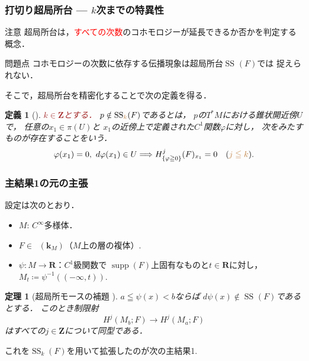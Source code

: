 \documentclass[dvipdfmx,10pt,aspectratio=169,leqno]{beamer}%
\newcommand{\zz}{\mathbf{Z}}
\newcommand{\rr}{\mathbf{R}}
\newcommand{\kk}{\mathbf{k}}
\numberwithin{equation}{subsection}
\newcommand{\supp}{\mathop{\mathrm{supp}}\nolimits}
\newcommand{\Dompb}{\mathop{\mathsf{D}^\mathrm{b}}\nolimits}
\newcommand{\muS}[1][]{\mathop{\mathrm{SS}}\nolimits_{#1}}
\newcommand{\cotb}[1][]{T^{\ast}{#1}}
\theoremstyle{mystyle}
\newtheorem{DFN}[AXM]{定義}
\newtheorem{THM}[AXM]{定理}
\begin{document}
\begin{frame}\frametitle{打切り超局所台 --- \(k\)次までの特異性}
    \begin{alertblock}{注意}
        超局所台は，\textcolor{red}{すべての次数}のコホモロジーが延長できるか否かを判定する概念．
    \end{alertblock}
    \begin{alertblock}{問題点}
      コホモロジーの次数に依存する伝播現象は超局所台\(\muS[](F)\)では
      捉えられない．
    \end{alertblock}
    
    そこで，超局所台を精密化することで次の定義を得る．
    \begin{DFN}[{\cite[Definition 3.4]{KFS03a}}]
        \textcolor{brown}{\(k\in\zz\)とする．}
        \(p\notin \muS[\textcolor{brown}{k}](F)\)であるとは，
        \(p\)の\(\cotb[M]\)における錐状開近傍\(U\)で，
        任意の\(x_1\in \pi(U)\)と
        \(x_1\)の近傍上で定義された\(C^{1}\)関数\(\varphi\)に対し，
        次をみたすものが存在することをいう．
        \[
            \varphi(x_1)=0,\ d\varphi(x_1)\in U
            \Longrightarrow
            H^{j}_{\{\varphi\geqq0\}}(F)_{x_1}=0
            \quad
            (\textcolor{brown}{j\leqq k}).
        \]
    \end{DFN}
\end{frame}



\begin{frame}
    \frametitle{主結果1の元の主張}
    設定は次のとおり．
    \begin{itemize}
        \item \(M\): \(C^{\infty}\)多様体．
        \item \(F\in\Dompb(\kk_{M})\)（\(M\)上の層の複体）.
        \item \(\psi\colon M\to \rr\)：\(C^1\)級関数で
        \(\supp(F)\)上固有なものと\(t\in\rr\)に対し，\(M_{t}\coloneqq \psi^{-1}((-\infty,t))\).
    \end{itemize}
    \begin{THM}[超局所モースの補題 {\cite{KS90}}]
        \(a\leqq\psi(x)< b\)ならば
        \(d\psi(x)\notin\muS[](F)\)であるとする．
        このとき制限射\[
            H^{j}(M_b;F)\longrightarrow H^{j}(M_a;F)
        \]はすべての\(j\in\zz\)について同型である．
    \end{THM}    
    これを\(\muS[k](F)\)を用いて拡張したのが次の主結果1.
\end{frame}
\end{document}
